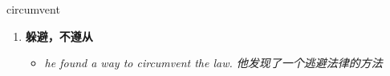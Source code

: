 
\begin{frame}
{\huge circumvent}
\begin{center}
\begin{enumerate}\Large
  \item \textbf{躲避，不遵从}
  \begin{itemize}
    \item \em{\Large{he found a way to circumvent the law. 他发现了一个逃避法律的方法}}
  \end{itemize}
\end{enumerate}
\end{center}
\end{frame}

